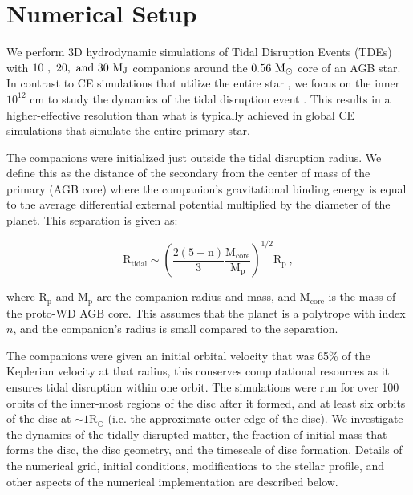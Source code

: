 \documentclass[fleqn,usenatbib]{mnras}
\begin{document}
\section{Numerical Setup}

We perform 3D hydrodynamic simulations of Tidal Disruption Events (TDEs) with $\mathrm{10\ ,\ 20, \ and \ 30} {\rm \ M_{\rm J}}$ companions around the ${\rm 0.56\ M_\odot}$ core of an AGB star. In contrast to CE simulations that utilize the entire star \citep{Sands_2020,Chamandy_2019,Chamandy_2019b, Chamandy_2020,Ohlmann_2015,Ohlmann2017,DeMarco2011, Ricker_2008, Ricker2012}, we focus on the inner $10^{12}$ cm to study the dynamics of the tidal disruption event . This results in a higher-effective resolution than what is typically achieved in global CE simulations that simulate the entire primary star.  

The companions were initialized just outside the tidal disruption radius. We define this as the distance of the secondary from the center of mass of the primary (AGB core) where the companion's gravitational binding energy is equal to the average differential external potential multiplied by the diameter of the planet. This separation is given as: 

\begin{equation}
    \mathrm{R_{tidal} \sim \left(\frac{2(5-n)}{3} \frac{M_{core}}{M_p}\right)^{1/2} R_p}\ ,
\end{equation}

where $\mathrm{R_p}$ and $\mathrm{M_p}$ are the companion radius and mass, and $\mathrm{M_{core}}$ is the mass of the proto-WD AGB core.  This assumes that the planet is a polytrope with index $n$, and the companion's radius is small compared to the separation.   

The companions were given an initial orbital velocity that was 65\% of the Keplerian velocity at that radius, this conserves computational resources as it ensures tidal disruption within one orbit. The simulations were run for over 100 orbits of the inner-most regions of the disc after it formed, and at least six orbits of the disc at $\sim$$\mathrm{1 R_\odot}$ (i.e. the approximate outer edge of the disc).  We investigate the dynamics of the tidally disrupted matter, the fraction of initial mass that forms the disc, the disc geometry, and the timescale of disc formation. Details of the numerical grid, initial conditions, modifications to the stellar profile, and other aspects of the numerical implementation are described below.
\end{document}
